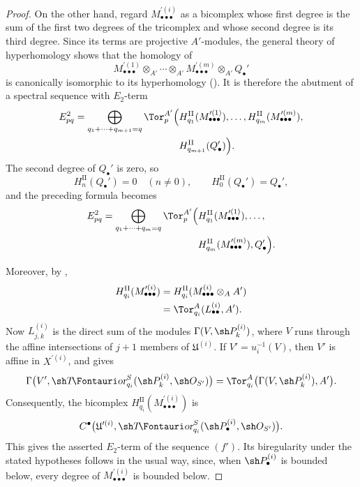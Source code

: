 \begin{proof}

On the other hand, regard
$M_{\bullet\bullet\bullet}^{\prime(i)}$ as a bicomplex whose first
degree is the sum of the first two degrees of the tricomplex and
whose second degree is its third degree.  Since its terms are
projective $A'$-modules, the general theory of hyperhomology shows
that the homology of
\[
  M_{\bullet\bullet\bullet}^{\prime(1)}
  \otimes_{A'}\cdots\otimes_{A'}
  M_{\bullet\bullet\bullet}^{\prime(m)}
  \otimes_{A'}Q_\bullet'
\]
is canonically isomorphic to its hyperhomology
().  It is therefore the abutment of a spectral
sequence with $E_2$-term
\[
\begin{split}
  E_{pq}^2
  =
  \bigoplus_{q_1+\cdots+q_{m+1}=q}
  \Tor_p^{A'}
  \Bigl(
    &
    H_{q_1}^{\mathrm{II}}
    (M_{\bullet\bullet\bullet}^{\prime(1)}),\ldots,
    H_{q_m}^{\mathrm{II}}
    (M_{\bullet\bullet\bullet}^{\prime(m)}),
    \\
    &
    H_{q_{m+1}}^{\mathrm{II}}(Q_\bullet')
  \Bigr).
\end{split}
\]
The second degree of $Q_\bullet'$ is zero, so
\[
  H_n^{\mathrm{II}}(Q_\bullet')=0
  \quad(n\neq0),
  \qquad
  H_0^{\mathrm{II}}(Q_\bullet')=Q_\bullet',
\]
and the preceding formula becomes
\[
\begin{split}
  E_{pq}^2
  =
  \bigoplus_{q_1+\cdots+q_m=q}
  \Tor_p^{A'}
  \Bigl(
    &
    H_{q_1}^{\mathrm{II}}
    (M_{\bullet\bullet\bullet}^{\prime(1)}),\ldots,
    \\
    &
    H_{q_m}^{\mathrm{II}}
    (M_{\bullet\bullet\bullet}^{\prime(m)}),
    Q_\bullet'
  \Bigr).
\end{split}
\]

Moreover, by ,
\[
\begin{split}
  H_{q_i}^{\mathrm{II}}
  (M_{\bullet\bullet\bullet}^{\prime(i)})
  &=
  H_{q_i}^{\mathrm{II}}
  (M_{\bullet\bullet\bullet}^{(i)}\otimes_AA')
  \\
  &=
  \Tor_{q_i}^A(L_{\bullet\bullet}^{(i)},A').
\end{split}
\]
Now $L_{j,k}^{(i)}$ is the direct sum of the modules
$\Gamma(V,\sh P_k^{(i)})$, where $V$ runs through the affine
intersections of $j+1$ members of $\mathfrak U^{(i)}$.  If
$V'=u_i^{-1}(V)$, then $V'$ is affine in $X^{\prime(i)}$, and
 gives
\[
  \Gamma
  \bigl(
    V',
    \shTor_{q_i}^S
    (\sh P_k^{(i)},\sh O_{S'})
  \bigr)
  =
  \Tor_{q_i}^A
  \bigl(
    \Gamma(V,\sh P_k^{(i)}),A'
  \bigr).
\]
Consequently, the bicomplex
$H_{q_i}^{\mathrm{II}}
(M_{\bullet\bullet\bullet}^{\prime(i)})$
is
\[
  C^\bullet
  \bigl(
    \mathfrak U^{\prime(i)},
    \shTor_{q_i}^S
    (\sh P_\bullet^{(i)},\sh O_{S'})
  \bigr).
\]
This gives the asserted $E_2$-term of the sequence $(f')$.  Its
biregularity under the stated hypotheses follows in the usual way,
since, when $\sh P_\bullet^{(i)}$ is bounded below, every degree of
$M_{\bullet\bullet\bullet}^{\prime(i)}$ is bounded below.
\end{proof}


